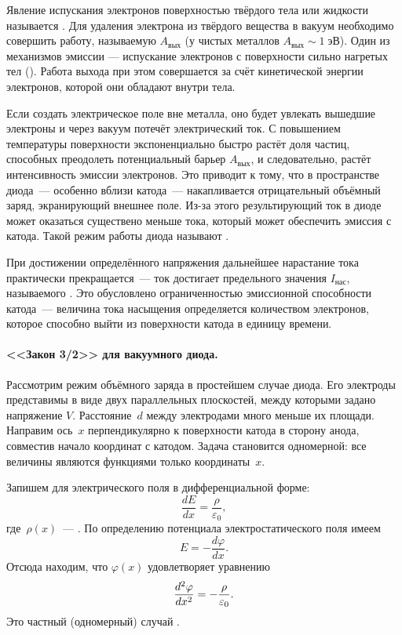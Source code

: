 Явление испускания электронов поверхностью твёрдого тела или жидкости называется
. Для удаления электрона из твёрдого вещества в
вакуум необходимо совершить работу, называемую  $A_{вых}$
(у чистых металлов $A_{вых}\sim 1\;эВ$).
Один из механизмов эмиссии --- испускание электронов с поверхности сильно
нагретых тел (). Работа выхода при этом
совершается за счёт кинетической энергии электронов, которой они обладают
внутри тела.

Если создать электрическое поле вне металла, оно будет увлекать вышедшие
электроны и через вакуум потечёт электрический ток.
С повышением температуры поверхности экспоненциально быстро растёт доля частиц,
способных преодолеть потенциальный барьер $A_{вых}$, и следовательно, растёт
интенсивность эмиссии электронов. Это приводит к тому, что в пространстве
диода~--- особенно вблизи катода~--- накапливается отрицательный
объёмный заряд, экранирующий внешнее поле. Из-за этого результирующий ток
в диоде может оказаться существено меньше тока, который может обеспечить эмиссия
с катода. Такой режим работы диода называют .

При достижении определённого напряжения дальнейшее нарастание тока практически
прекращается~--- ток достигает предельного значения $I_{нас}$, называемого
. Это обусловлено ограниченностью эмиссионной способности
катода~--- величина тока насыщения определяется количеством электронов,
которое способно выйти из поверхности катода в единицу времени.

\paragraph{<<Закон 3/2>> для вакуумного диода.}
Рассмотрим режим объёмного заряда в простейшем случае 
диода. Его электроды представимы в виде двух параллельных плоскостей,
между которыми задано напряжение $V$. Расстояние~$d$ между электродами много
меньше их площади. Направим ось~$x$ перпендикулярно к поверхности катода
в сторону анода, совместив начало координат с катодом. Задача
становится одномерной: все величины являются функциями только координаты~$x$.

Запишем для электрического поля  в дифференциальной
форме:
\[
\frac{dE}{dx} = \frac{\rho}{\varepsilon_0},
\]
где~$\rho(x)$~--- . По определению
потенциала электростатического поля имеем
\[
E = -\frac{d\varphi}{dx}.
\]
Отсюда находим, что $\varphi(x)$ удовлетворяет уравнению
\begin{equation}
    \eqmark{3.14}
    \frac{d^2\varphi}{dx^2}=-\frac{\rho}{\varepsilon_0}.
\end{equation}
Это частный (одномерный) случай .

